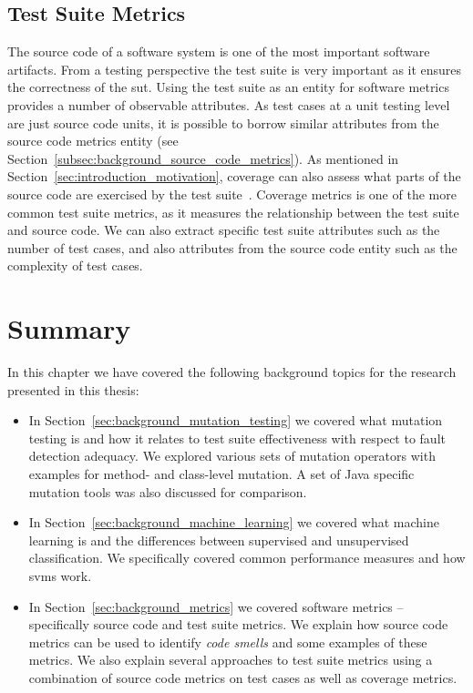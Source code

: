 \subsection{Test Suite Metrics}
\label{subsec:background_test_suite_metrics}
The source code of a software system is one of the most important software artifacts. From a testing perspective the test suite is very important as it ensures the correctness of the \gls{sut}. Using the test suite as an entity for software metrics provides a number of observable attributes. As test cases at a unit testing level are just source code units, it is possible to borrow similar attributes from the source code metrics entity (see Section~\ref{subsec:background_source_code_metrics}). As mentioned in Section~\ref{sec:introduction_motivation}, coverage can also assess what parts of the source code are exercised by the test suite~\cite{ZHM97}. Coverage metrics is one of the more common test suite metrics, as it measures the relationship between the test suite and source code. We can also extract specific test suite attributes such as the number of test cases, and also attributes from the source code entity such as the complexity of test cases.


\section{Summary}
\label{sec:background_summary}
In this chapter we have covered the following background topics for the research presented in this thesis:

\begin{itemize}
  \item In Section~\ref{sec:background_mutation_testing} we covered what mutation testing is and how it relates to test suite effectiveness with respect to fault detection adequacy. We explored various sets of mutation operators with examples for method- and class-level mutation. A set of Java specific mutation tools was also discussed  for comparison.
  \item In Section~\ref{sec:background_machine_learning} we covered what machine learning is and the differences between supervised and unsupervised classification. We specifically covered common performance measures and how \gls{svm}s work.
  \item In Section~\ref{sec:background_metrics} we covered software metrics -- specifically source code and test suite metrics. We explain how source code metrics can be used to identify \emph{code smells} and some examples of these metrics. We also explain several approaches to test suite metrics using a combination of source code metrics on test cases as well as coverage metrics.
\end{itemize}

